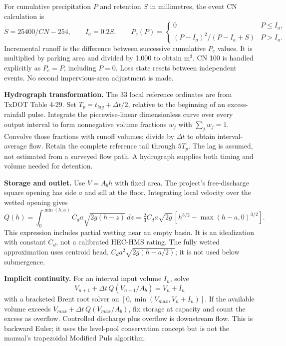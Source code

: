 \documentclass[10pt,letterpaper]{article}
\begin{document}
For cumulative precipitation $P$ and retention $S$ in millimetres, the event CN calculation is\cite{cn}
\[
S=25400/CN-254,\qquad I_a=0.2S,\qquad
P_e(P)=\begin{cases}0&P\leq I_a,\\(P-I_a)^2/(P-I_a+S)&P>I_a.\end{cases}
\]
Incremental runoff is the difference between successive cumulative $P_e$ values. It is multiplied by parking area and divided by 1,000 to obtain m$^3$. CN 100 is handled explicitly as $P_e=P$, including $P=0$. Loss state resets between independent events. No second impervious-area adjustment is made.

\textbf{Hydrograph transformation.} The 33 local reference ordinates are from TxDOT Table 4-29.\cite{ordinates} Set $T_p=t_{lag}+\Delta t/2$, relative to the beginning of an excess-rainfall pulse.\cite{uh} Integrate the piecewise-linear dimensionless curve over every output interval to form nonnegative volume fractions $w_j$ with $\sum_j w_j=1$. Convolve those fractions with runoff volumes; divide by $\Delta t$ to obtain interval-average flow. Retain the complete reference tail through $5T_p$. The lag is assumed, not estimated from a surveyed flow path. A hydrograph supplies both timing and volume needed for detention.\cite{selection}

\textbf{Storage and outlet.} Use $V=A_bh$ with fixed area. The project's free-discharge square opening has side $a$ and sill at the floor. Integrating local velocity over the wetted opening gives
\[
Q(h)=\int_0^{\min(h,a)} C_da\sqrt{2g(h-z)}\,dz
=\tfrac23 C_da\sqrt{2g}\,[h^{3/2}-\max(h-a,0)^{3/2}].
\]
This expression includes partial wetting near an empty basin. It is an idealization with constant $C_d$, not a calibrated HEC-HMS rating. The fully wetted approximation uses centroid head, $C_da^2\sqrt{2g(h-a/2)}$; it is not used below submergence.\cite{outlet}

\textbf{Implicit continuity.} For an interval input volume $I_n$, solve
\[
V_{n+1}+\Delta t\,Q(V_{n+1}/A_b)=V_n+I_n
\]
with a bracketed Brent root solver on $[0,\min(V_{max},V_n+I_n)]$. If the available volume exceeds $V_{max}+\Delta t\,Q(V_{max}/A_b)$, fix storage at capacity and count the excess as overflow. Controlled discharge plus overflow is downstream flow. This is backward Euler; it uses the level-pool conservation concept but is not the manual's trapezoidal Modified Puls algorithm.\cite{routing}
\end{document}
